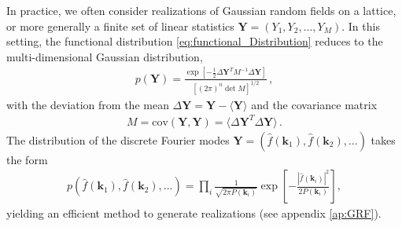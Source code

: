 \documentclass[a4paper, 11pt]{article}
\begin{document}


In practice, we often consider realizations of Gaussian random fields on a lattice, or more generally a finite set of linear statistics $\bm{Y}=(Y_1,Y_2,\dots,Y_M)$. In this setting, the functional distribution \eqref{eq:functional_Distribution} reduces to the multi-dimensional Gaussian distribution,
\begin{align}
p(\bm{Y}) = \frac{\exp\left[-\frac{1}{2}  \Delta \bm{Y}^T M^{-1} \Delta \bm{Y}\right]}{[(2\pi)^n \det M]^{1/2}}\,,
\end{align}
with the deviation from the mean $\Delta \bm{Y} = \bm{Y} - \langle \bm{Y}\rangle$ and the covariance matrix
\begin{align}
M = \text{cov}(\bm{Y},\bm{Y}) = \langle \Delta \bm{Y}^T \Delta \bm{Y}\rangle\,.
\end{align}
The distribution of the discrete Fourier modes $\bm{Y}=(\hat{f}(\bm{k}_1),\hat{f}(\bm{k}_2),\dots)$ takes the form 
\begin{align}
p(\hat{f}(\bm{k}_1), \hat{f}(\bm{k}_2), \dots) = \prod_{i} \frac{1}{\sqrt{2\pi P( \bm{k}_i)}} \exp\left[-\frac{|\hat{f}(\bm{k}_i)|^2}{2P(\bm{k}_i)}\right],
\end{align}
yielding an efficient method to generate realizations (see appendix \ref{ap:GRF}).
\end{document}
